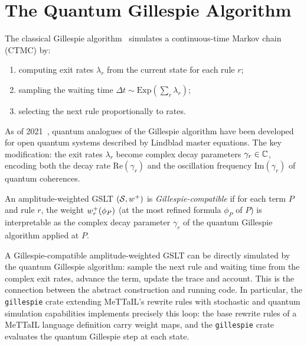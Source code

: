 \section{The Quantum Gillespie Algorithm}

The classical Gillespie algorithm~\cite{gillespie1977exact} simulates a
continuous-time Markov chain (CTMC) by:
\begin{enumerate}[itemsep=2pt]
  \item computing exit rates $\lambda_r$ from the current state for each rule $r$;
  \item sampling the waiting time $\Delta t \sim \mathrm{Exp}(\sum_r \lambda_r)$;
  \item selecting the next rule proportionally to rates.
\end{enumerate}
As of 2021~\cite{cao2021quantum}, quantum analogues of the Gillespie algorithm
have been developed for open quantum systems described by Lindblad master
equations.  The key modification: the exit rates $\lambda_r$ become complex
decay parameters $\gamma_r \in \mathbb{C}$, encoding both the decay rate
$\mathrm{Re}(\gamma_r)$ and the oscillation frequency $\mathrm{Im}(\gamma_r)$
of quantum coherences.

\begin{definition}
An amplitude-weighted GSLT $(\mathcal{S}, w^{+})$ is \emph{Gillespie-compatible} if
for each term $P$ and rule $r$, the weight $w^{+}_r(\phi_P)$ (at the most
refined formula $\phi_P$ of $P$) is interpretable as the complex decay
parameter $\gamma_r$ of the quantum Gillespie algorithm applied at $P$.
\end{definition}

\begin{remark}[Simulation]
A Gillespie-compatible amplitude-weighted GSLT can be directly simulated by
the quantum Gillespie algorithm: sample the next rule and waiting time from the
complex exit rates, advance the term, update the trace and account.  This is
the connection between the abstract construction and running code.  In
particular, the \texttt{gillespie} crate extending MeTTaIL's rewrite rules with
stochastic and quantum simulation capabilities implements precisely this loop:
the base rewrite rules of a MeTTaIL language definition carry weight maps, and
the \texttt{gillespie} crate evaluates the quantum Gillespie step at each state.
\end{remark}

